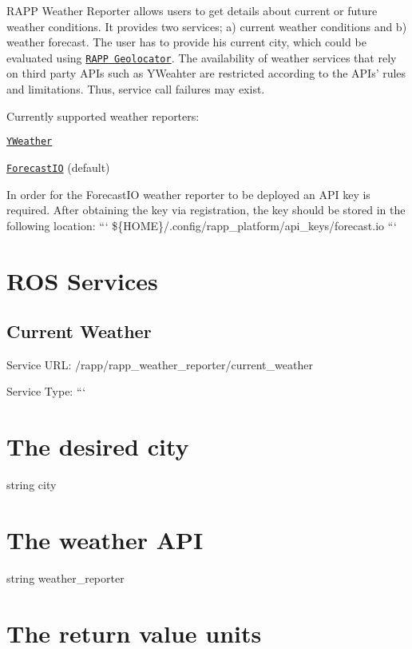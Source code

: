 R\-A\-P\-P Weather Reporter allows users to get details about current or future weather conditions. It provides two services; a) current weather conditions and b) weather forecast. The user has to provide his current city, which could be evaluated using \href{https://github.com/rapp-project/rapp-platform/wiki/RAPP-Geolocator}{\tt R\-A\-P\-P Geolocator}. The availability of weather services that rely on third party A\-P\-Is such as Y\-Weahter are restricted according to the A\-P\-Is' rules and limitations. Thus, service call failures may exist.

Currently supported weather reporters\-:
\begin{DoxyItemize}
\item \href{https://pypi.python.org/pypi/yweather/}{\tt Y\-Weather}
\item \href{https://forecast.io}{\tt Forecast\-I\-O} (default)
\end{DoxyItemize}

In order for the Forecast\-I\-O weather reporter to be deployed an A\-P\-I key is required. After obtaining the key via registration, the key should be stored in the following location\-: ``` \$\{H\-O\-M\-E\}/.config/rapp\-\_\-platform/api\-\_\-keys/forecast.\-io ```

\section*{R\-O\-S Services}

\subsection*{Current Weather}

Service U\-R\-L\-: {\ttfamily /rapp/rapp\-\_\-weather\-\_\-reporter/current\-\_\-weather}

Service Type\-: ``` \section*{The desired city}

string city \section*{The weather A\-P\-I}

string weather\-\_\-reporter \section*{The return value units}

